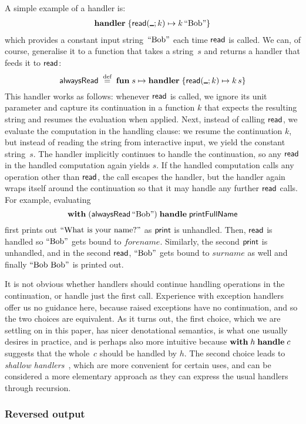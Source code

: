 \documentclass{article}
\begin{document}
A simple example of a handler is:
%
\begin{align*}
  \handler \{
    \opclause[\read]{\anon}{k} k \, \str{Bob}
  \}
\end{align*}
%
which provides a constant input string~$\mathord{\text{``Bob''}}$ each time $\mathsf{read}$ is called.
We can, of course, generalise it to a function that takes a
string~$s$ and returns a handler that feeds it to $\mathsf{read}$:
\[
  \kst{alwaysRead} \defeq \fun{s} \handler \{
    \opclause[\read]{\anon}{k} k \, s
  \}
\]
This handler works as follows: whenever $\mathsf{read}$ is called, we ignore its unit
parameter and capture its continuation in a function $k$ that expects the
resulting string and resumes the evaluation when applied. Next, instead of calling
$\mathsf{read}$, we evaluate the computation in the handling clause: we resume the
continuation $k$, but instead of reading the string from interactive input, we
yield the constant string~$s$. The handler implicitly continues to
handle the continuation, so any $\mathsf{read}$ in the handled computation again yields
$s$. If the handled computation calls any operation other than $\mathsf{read}$, the call
escapes the handler, but the handler again wraps itself around the continuation
so that it may handle any further $\mathsf{read}$ calls. For example, evaluating
\[
  \mathbf{with}\; (\mathord{\mathsf{alwaysRead}} \, \mathord{\text{``Bob''}}) \;\mathbf{handle}\; \mathord{\mathsf{printFullName}}
\]
first prints out $\mathord{\text{``What is your name?''}}$ as $\mathsf{print}$ is unhandled. Then, $\mathsf{read}$
is handled so $\mathord{\text{``Bob''}}$ gets bound to $forename$. Similarly, the second $\mathsf{print}$
is unhandled, and in the second $\mathsf{read}$, $\mathord{\text{``Bob''}}$ gets bound to $surname$ as
well and finally $\mathord{\text{``Bob Bob''}}$ is printed out.

It is not obvious whether handlers should continue handling operations in the
continuation, or handle just the first call. Experience with exception handlers
offer us no guidance here, because raised exceptions have no continuation, and so the two
choices are equivalent. As it turns out, the first choice, which we are
settling on in this paper, has nicer denotational semantics, is what one usually desires in practice, and is
perhaps also more intuitive because $\mathbf{with}\; h \;\mathbf{handle}\; c$ suggests that the whole~$c$ should be handled by $h$. The second choice leads to \emph{shallow
handlers}~\cite{DBLP:conf/icfp/KammarLO13}, which are more convenient for certain uses,
and can be considered a more elementary approach as they can express the usual
handlers through recursion.

\subsubsection{Reversed output}
\end{document}
